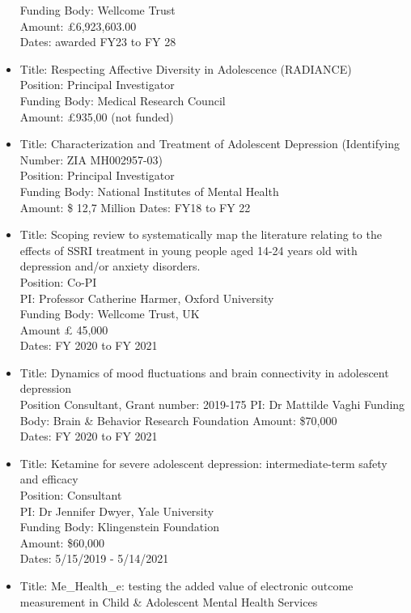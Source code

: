 \documentclass[
]{article}
\begin{document}
\begin{itemize}
  Funding Body: Wellcome Trust\\
  Amount: £6,923,603.00\\
  Dates: awarded FY23 to FY 28
\item
  Title: Respecting Affective Diversity in Adolescence (RADIANCE)\\
  Position: Principal Investigator\\
  Funding Body: Medical Research Council\\
  Amount: £935,00 (not funded)
\item
  Title: Characterization and Treatment of Adolescent Depression
  (Identifying Number: ZIA MH002957-03)\\
  Position: Principal Investigator\\
  Funding Body: National Institutes of Mental Health\\
  Amount: \$ 12,7 Million Dates: FY18 to FY 22
\item
  Title: Scoping review to systematically map the literature relating to
  the effects of SSRI treatment in young people aged 14-24 years old
  with depression and/or anxiety disorders.\\
  Position: Co-PI\\
  PI: Professor Catherine Harmer, Oxford University\\
  Funding Body: Wellcome Trust, UK\\
  Amount £ 45,000\\
  Dates: FY 2020 to FY 2021
\item
  Title: Dynamics of mood fluctuations and brain connectivity in
  adolescent depression\\
  Position Consultant, Grant number: 2019-175 PI: Dr Mattilde Vaghi
  Funding Body: Brain \& Behavior Research Foundation Amount: \$70,000\\
  Dates: FY 2020 to FY 2021
\item
  Title: Ketamine for severe adolescent depression: intermediate-term
  safety and efficacy\\
  Position: Consultant\\
  PI: Dr Jennifer Dwyer, Yale University\\
  Funding Body: Klingenstein Foundation\\
  Amount: \$60,000\\
  Dates: 5/15/2019 - 5/14/2021
\item
  Title: Me\_Health\_e: testing the added value of electronic outcome
  measurement in Child \& Adolescent Mental Health Services\\

\end{itemize}
\end{document}

